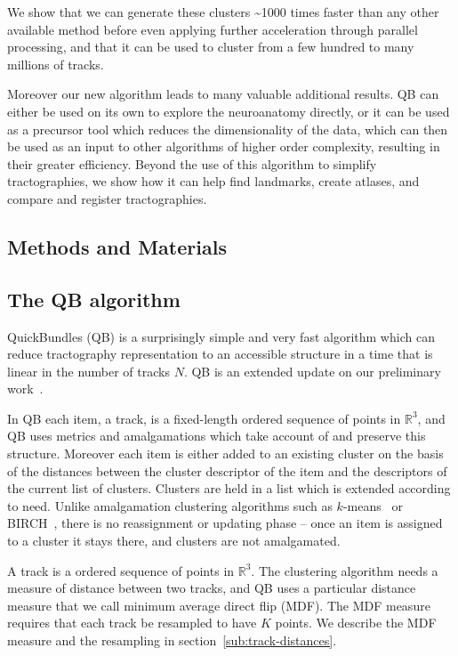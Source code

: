 \documentclass{bioinfo}
\begin{document}
We show that we can generate these clusters \textasciitilde1000 times faster than
any other available method before even applying further
acceleration through parallel processing, and that it can be used to
cluster from a few hundred to many millions of tracks.

Moreover our new algorithm leads to many valuable additional results. QB
can either be used on its own to explore the neuroanatomy directly, or
it can be used as a precursor tool which reduces the dimensionality of
the data, which can then be used as an input to other algorithms of
higher order complexity, resulting in their greater efficiency. Beyond
the use of this algorithm to simplify tractographies, we show how it can
help find landmarks, create atlases, and compare and register
tractographies.

\begin{methods}

\section{Methods and Materials}

\subsection{The QB algorithm\label{sub:QB-description}}

QuickBundles (QB) is a surprisingly simple and very fast algorithm which
can reduce tractography representation to an accessible structure in a
time that is linear in the number of tracks $N$. QB is an extended
update on our preliminary work~\citet{EGMB10}.

In QB each item, a track, is a fixed-length ordered sequence of points
in $\mathbb{R}^{3}$, and QB uses metrics and amalgamations which take
account of and preserve this structure.  Moreover each item is either
added to an existing cluster on the basis of the distances between the
cluster descriptor of the item and the descriptors of the current list of
clusters. Clusters are held in a list which is extended according to
need. Unlike amalgamation clustering algorithms such as
$k$-means~\citep{steinhaus1956division, macqueen1967some} or
BIRCH~\citep{zhang1997birch}, there is no reassignment or updating phase
-- once an item is assigned to a cluster it stays there, and clusters
are not amalgamated.

A track is a ordered sequence of points in $\mathbb{R}^{3}$.  The
clustering algorithm needs a measure of distance between two tracks, and
QB uses a particular distance measure that we call minimum average
direct flip (MDF).  The MDF measure requires that each track be
resampled to have $K$ points. We describe the MDF measure and the
resampling in section~\ref{sub:track-distances}.


\end{methods}
\end{document}
